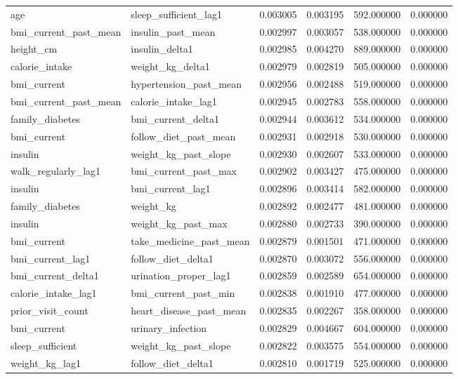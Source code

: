 \begin{longtable}{llrrrr}
age & sleep\_sufficient\_lag1 & 0.003005 & 0.003195 & 592.000000 & 0.000000 \\
bmi\_current\_past\_mean & insulin\_past\_mean & 0.002997 & 0.003057 & 538.000000 & 0.000000 \\
height\_cm & insulin\_delta1 & 0.002985 & 0.004270 & 889.000000 & 0.000000 \\
calorie\_intake & weight\_kg\_delta1 & 0.002979 & 0.002819 & 505.000000 & 0.000000 \\
bmi\_current & hypertension\_past\_mean & 0.002956 & 0.002488 & 519.000000 & 0.000000 \\
bmi\_current\_past\_mean & calorie\_intake\_lag1 & 0.002945 & 0.002783 & 558.000000 & 0.000000 \\
family\_diabetes & bmi\_current\_delta1 & 0.002944 & 0.003612 & 534.000000 & 0.000000 \\
bmi\_current & follow\_diet\_past\_mean & 0.002931 & 0.002918 & 530.000000 & 0.000000 \\
insulin & weight\_kg\_past\_slope & 0.002930 & 0.002607 & 533.000000 & 0.000000 \\
walk\_regularly\_lag1 & bmi\_current\_past\_max & 0.002902 & 0.003427 & 475.000000 & 0.000000 \\
insulin & bmi\_current\_lag1 & 0.002896 & 0.003414 & 582.000000 & 0.000000 \\
family\_diabetes & weight\_kg & 0.002892 & 0.002477 & 481.000000 & 0.000000 \\
insulin & weight\_kg\_past\_max & 0.002880 & 0.002733 & 390.000000 & 0.000000 \\
bmi\_current & take\_medicine\_past\_mean & 0.002879 & 0.001501 & 471.000000 & 0.000000 \\
bmi\_current\_lag1 & follow\_diet\_delta1 & 0.002870 & 0.003072 & 556.000000 & 0.000000 \\
bmi\_current\_delta1 & urination\_proper\_lag1 & 0.002859 & 0.002589 & 654.000000 & 0.000000 \\
calorie\_intake\_lag1 & bmi\_current\_past\_min & 0.002838 & 0.001910 & 477.000000 & 0.000000 \\
prior\_visit\_count & heart\_disease\_past\_mean & 0.002835 & 0.002267 & 358.000000 & 0.000000 \\
bmi\_current & urinary\_infection & 0.002829 & 0.004667 & 604.000000 & 0.000000 \\
sleep\_sufficient & weight\_kg\_past\_slope & 0.002822 & 0.003575 & 554.000000 & 0.000000 \\
weight\_kg\_lag1 & follow\_diet\_delta1 & 0.002810 & 0.001719 & 525.000000 & 0.000000 \\

\end{longtable}
